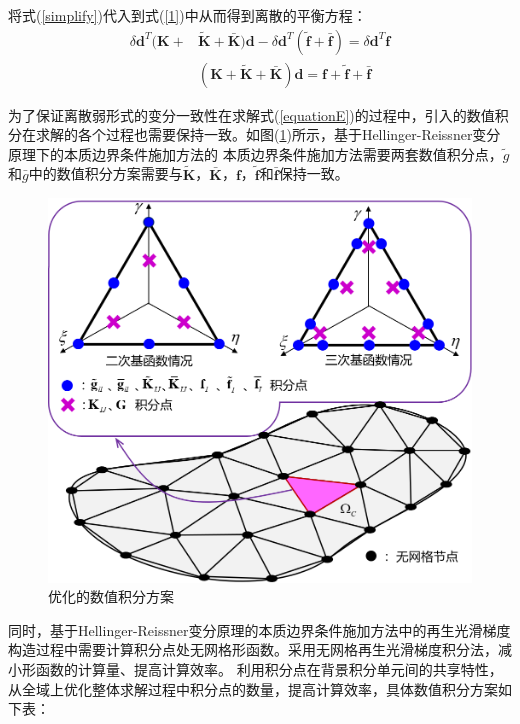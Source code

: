 将式(\ref{simplify})代入到式(\ref{1})中从而得到离散的平衡方程：
\begin{equation}\label{equationE}
\begin{split}
    \delta\pmb{d}^T(\pmb{K}+&\tilde{\pmb{K}}+\bar{\pmb{K}})\pmb{d}-\delta\pmb{d}^T(\tilde{\pmb{f}}+\bar{\pmb{f}})=\delta\pmb{d}^T\pmb{f}\\
    &(\pmb{K}+\pmb{\tilde{K}}+\pmb{\bar{K}})\pmb{d}=\pmb{f}+\tilde{\pmb{f}}+\bar{\pmb{f}}
\end{split}
\end{equation}\par
为了保证离散弱形式的变分一致性在求解式(\ref{equationE})的过程中，引入的数值积分在求解的各个过程也需要保持一致。如图(\ref{strain})所示，基于Hellinger-Reissner变分原理下的本质边界条件施加方法的
本质边界条件施加方法需要两套数值积分点，$\tilde{g}$和$\bar{g}$中的数值积分方案需要与$\tilde{\pmb{K}}$，$\bar{\pmb{K}}$，$\pmb{f}$，$\tilde{\pmb{f}}$和$\bar{\pmb{f}}$保持一致。\par
\begin{figure}[!h]
    \centering
    \includegraphics[scale=0.7]{figure/strain.png}
    \caption{优化的数值积分方案}\label{strain}
\end{figure}
同时，基于Hellinger-Reissner变分原理的本质边界条件施加方法中的再生光滑梯度构造过程中需要计算积分点处无网格形函数。采用无网格再生光滑梯度积分法，减小形函数的计算量、提高计算效率。
利用积分点在背景积分单元间的共享特性，从全域上优化整体求解过程中积分点的数量，提高计算效率，具体数值积分方案如下表：\par    
